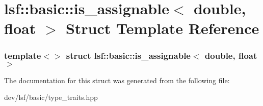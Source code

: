 \hypertarget{structlsf_1_1basic_1_1is__assignable_3_01double_00_01float_01_4}{
\section{lsf::basic::is\_\-assignable$<$ double, float $>$ Struct Template Reference}
\label{structlsf_1_1basic_1_1is__assignable_3_01double_00_01float_01_4}
}
\subsubsection*{template$<$$>$ struct lsf::basic::is\_\-assignable$<$ double, float $>$}



The documentation for this struct was generated from the following file:\begin{DoxyCompactItemize}
\item 
dev/lsf/basic/type\_\-traits.hpp\end{DoxyCompactItemize}
